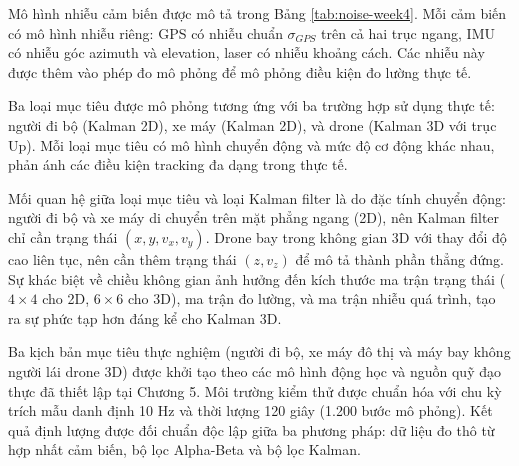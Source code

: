 Mô hình nhiễu cảm biến được mô tả trong Bảng \ref{tab:noise-week4}. Mỗi cảm biến có mô hình nhiễu riêng: GPS có nhiễu chuẩn $\sigma_{GPS}$ trên cả hai trục ngang, IMU có nhiễu góc azimuth và elevation, laser có nhiễu khoảng cách. Các nhiễu này được thêm vào phép đo mô phỏng để mô phỏng điều kiện đo lường thực tế.

\begin{table}[H]
\centering
\caption{Thông số nhiễu cảm biến trong mô phỏng}
\label{tab:noise-week4}
\end{table}

Ba loại mục tiêu được mô phỏng tương ứng với ba trường hợp sử dụng thực tế: người đi bộ (Kalman 2D), xe máy (Kalman 2D), và drone (Kalman 3D với trục Up). Mỗi loại mục tiêu có mô hình chuyển động và mức độ cơ động khác nhau, phản ánh các điều kiện tracking đa dạng trong thực tế.

Mối quan hệ giữa loại mục tiêu và loại Kalman filter là do đặc tính chuyển động: người đi bộ và xe máy di chuyển trên mặt phẳng ngang (2D), nên Kalman filter chỉ cần trạng thái $(x, y, v_x, v_y)$. Drone bay trong không gian 3D với thay đổi độ cao liên tục, nên cần thêm trạng thái $(z, v_z)$ để mô tả thành phần thẳng đứng. Sự khác biệt về chiều không gian ảnh hưởng đến kích thước ma trận trạng thái ($4 \times 4$ cho 2D, $6 \times 6$ cho 3D), ma trận đo lường, và ma trận nhiễu quá trình, tạo ra sự phức tạp hơn đáng kể cho Kalman 3D.

\hspace{0.5cm} Ba kịch bản mục tiêu thực nghiệm (người đi bộ, xe máy đô thị và máy bay không người lái drone 3D) được khởi tạo theo các mô hình động học và nguồn quỹ đạo thực đã thiết lập tại Chương 5. Môi trường kiểm thử được chuẩn hóa với chu kỳ trích mẫu danh định 10 Hz và thời lượng 120 giây (1.200 bước mô phỏng). Kết quả định lượng được đối chuẩn độc lập giữa ba phương pháp: dữ liệu đo thô từ hợp nhất cảm biến, bộ lọc Alpha-Beta và bộ lọc Kalman.

